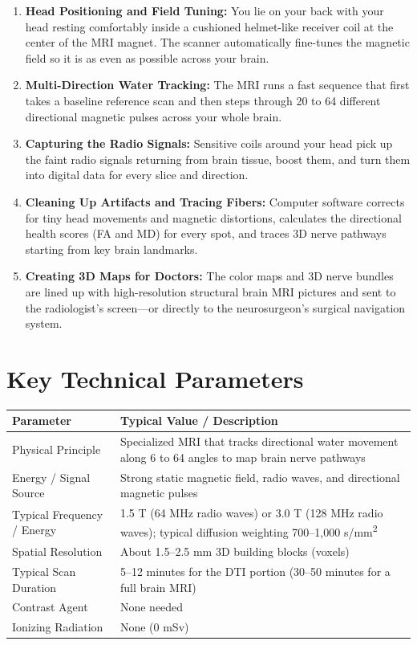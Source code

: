 \begin{enumerate}
    \item \textbf{Head Positioning and Field Tuning:} You lie on your back with your head resting comfortably inside a cushioned helmet-like receiver coil at the center of the MRI magnet. The scanner automatically fine-tunes the magnetic field so it is as even as possible across your brain.
    \item \textbf{Multi-Direction Water Tracking:} The MRI runs a fast sequence that first takes a baseline reference scan and then steps through 20 to 64 different directional magnetic pulses across your whole brain.
    \item \textbf{Capturing the Radio Signals:} Sensitive coils around your head pick up the faint radio signals returning from brain tissue, boost them, and turn them into digital data for every slice and direction.
    \item \textbf{Cleaning Up Artifacts and Tracing Fibers:} Computer software corrects for tiny head movements and magnetic distortions, calculates the directional health scores (FA and MD) for every spot, and traces 3D nerve pathways starting from key brain landmarks.
    \item \textbf{Creating 3D Maps for Doctors:} The color maps and 3D nerve bundles are lined up with high-resolution structural brain MRI pictures and sent to the radiologist's screen---or directly to the neurosurgeon's surgical navigation system.
\end{enumerate}

\section{Key Technical Parameters}

\noindent
\begin{tabularx}{\textwidth}{@{}l X@{}}
\toprule
\textbf{Parameter} & \textbf{Typical Value / Description} \\
\midrule
Physical Principle & Specialized MRI that tracks directional water movement along 6 to 64 angles to map brain nerve pathways \\
Energy / Signal Source & Strong static magnetic field, radio waves, and directional magnetic pulses \\
Typical Frequency / Energy & 1.5 T (64 MHz radio waves) or 3.0 T (128 MHz radio waves); typical diffusion weighting 700--1,000 s/mm\textsuperscript{2} \\
Spatial Resolution & About 1.5--2.5 mm 3D building blocks (voxels) \\
Typical Scan Duration & 5--12 minutes for the DTI portion (30--50 minutes for a full brain MRI) \\
Contrast Agent & None needed \\
Ionizing Radiation & None (0 mSv) \\
\bottomrule
\end{tabularx}


